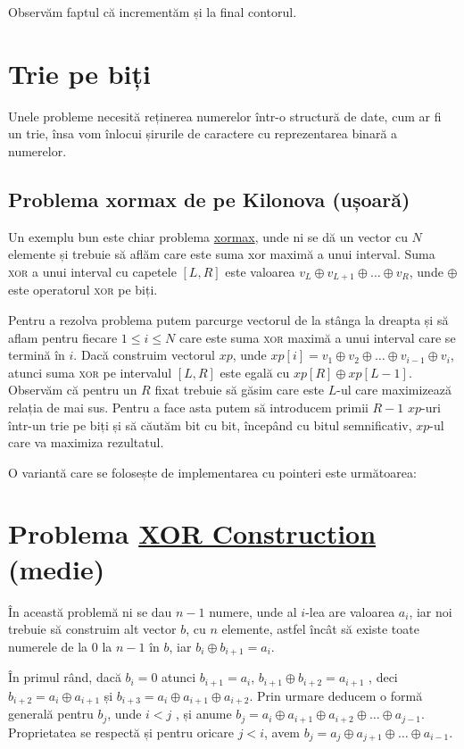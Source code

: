 Observăm faptul că incrementăm și la final contorul.

\section{Trie pe biți}
Unele probleme necesită reținerea numerelor într-o structură de date, cum ar fi un trie, însa vom înlocui șirurile de caractere cu reprezentarea binară a numerelor.

\subsection{Problema xormax de pe Kilonova (ușoară)}
Un exemplu bun este chiar problema \href{https://kilonova.ro/problems/1984}{xormax}, unde ni se dă un vector cu $N$ elemente și trebuie să aflăm care este suma xor maximă a unui interval. Suma \textsc{xor} a unui interval cu capetele $[L, R]$ este valoarea  $v_L \oplus v_{L+1} \oplus \dots \oplus v_R$, unde $\oplus$ este operatorul \textsc{xor} pe biți.

Pentru a rezolva problema putem parcurge vectorul de la stânga la dreapta și să aflam pentru fiecare $1 \leq i \leq N$ care este suma \textsc{xor} maximă a unui interval care se termină în $i$. Dacă construim vectorul $xp$, unde $xp[i] = v_1 \oplus v_2 \oplus \dots \oplus v_{i-1} \oplus v_i$, atunci suma \textsc{xor} pe intervalul $[L, R]$ este egală cu $xp[R] \oplus xp[L-1]$. Observăm că pentru un $R$ fixat trebuie să găsim care este $L$-ul care maximizează relația de mai sus. Pentru a face asta putem să introducem primii $R-1$ $xp$-uri într-un trie pe biți și să căutăm bit cu bit, începând cu bitul semnificativ, $xp$-ul care va maximiza rezultatul.

O variantă care se folosește de implementarea cu pointeri este următoarea:


\section{Problema \href{https://codeforces.com/contest/1895/problem/D}{XOR Construction} (medie)}
În această problemă ni se dau $n-1$ numere, unde al $i$-lea are valoarea $a_i$, iar noi trebuie să construim alt vector $b$, cu $n$ elemente, astfel încât să existe toate numerele de la $0$ la $n-1$ în $b$, iar $b_i \oplus b_{i+1} = a_i$.

În primul rând, dacă $b_i = 0$ atunci $b_{i+1} = a_i$, $b_{i+1} \oplus b_{i+2} = a_{i+1}$ , deci $b_{i+2} = a_i \oplus a_{i+1}$ și $b_{i+3} = a_i \oplus a_{i+1} \oplus a_{i+2}$. Prin urmare deducem o formă generală pentru $b_j$, unde $i < j$ , și anume $b_j = a_i \oplus a_{i+1} \oplus a_{i+2} \oplus \dots \oplus a_{j-1}$. Proprietatea se respectă și pentru oricare $j < i$, avem $b_j = a_j \oplus a_{j+1} \oplus \dots \oplus a_{i-1}$.

